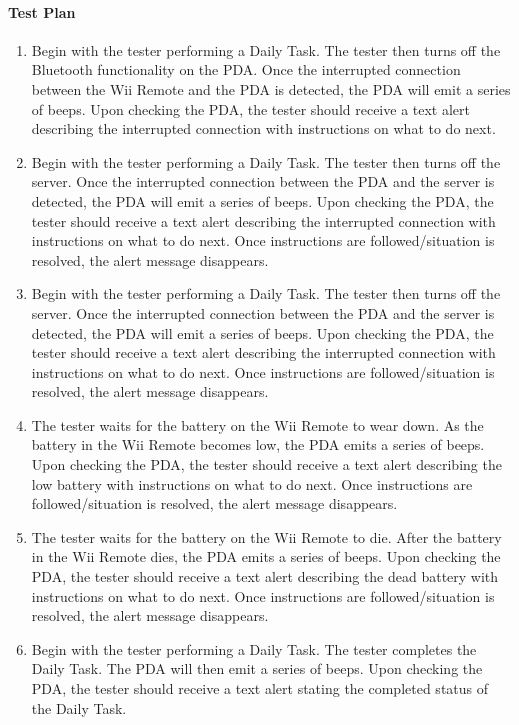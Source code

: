 \documentclass{article}
\begin{document}
\paragraph {Test Plan}
\begin{enumerate}
\item Begin with the tester performing a Daily Task. The tester then turns off the Bluetooth functionality on the PDA. Once the interrupted connection between the Wii Remote and the PDA is detected, the PDA will emit a series of beeps. Upon checking the PDA, the tester should receive a text alert describing the interrupted connection with instructions on what to do next.
\item Begin with the tester performing a Daily Task. The tester then turns off the server. Once the interrupted connection between the PDA and the server is detected, the PDA will emit a series of beeps. Upon checking the PDA, the tester should receive a text alert describing the interrupted connection with instructions on what to do next. Once instructions are followed/situation is resolved, the alert message disappears.
\item Begin with the tester performing a Daily Task. The tester then turns off the server. Once the interrupted connection between the PDA and the server is detected, the PDA will emit a series of beeps. Upon checking the PDA, the tester should receive a text alert describing the interrupted connection with instructions on what to do next. Once instructions are followed/situation is resolved, the alert message disappears.
\item The tester waits for the battery on the Wii Remote to wear down.  As the battery in the Wii Remote becomes low, the PDA emits a series of beeps.  Upon checking the PDA, the tester should receive a text alert describing the low battery with instructions on what to do next. Once instructions are followed/situation is resolved, the alert message disappears.
\item The tester waits for the battery on the Wii Remote to die.  After the battery in the Wii Remote dies, the PDA emits a series of beeps. Upon checking the PDA, the tester should receive a text alert describing the dead battery with instructions on what to do next. Once instructions are followed/situation is resolved, the alert message disappears.
\item Begin with the tester performing a Daily Task. The tester completes the Daily Task. The PDA will then emit a series of beeps. Upon checking the PDA, the tester should receive a text alert stating the completed status of the Daily Task.
\end{enumerate}
\end{document}

